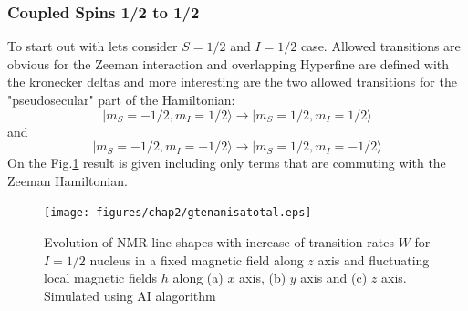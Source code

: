 \subsubsection{Coupled Spins 1/2 to 1/2}\label{coupledspinonehalfsection}
To start out with lets consider $S=1/2$ and $I=1/2$ case. Allowed transitions are obvious for the Zeeman interaction and overlapping Hyperfine are defined with the kronecker deltas and more interesting are the two allowed transitions for the "pseudosecular" part of the Hamiltonian:
$$|m_S=-1/2,m_I=1/2\rangle\rightarrow|m_S=1/2,m_I=1/2\rangle$$ 
and 
$$|m_S=-1/2,m_I=-1/2\rangle\rightarrow|m_S=1/2,m_I=-1/2\rangle$$ 
On the Fig.\ref{figure:spin05} result is given including only terms that are commuting with the Zeeman Hamiltonian. 
\begin{figure}[h!]
\centering
\texttt{[image: figures/chap2/gtenanisatotal.eps]}
\caption{Evolution of NMR line shapes with increase of transition rates $W$ for $I=1/2$ nucleus in a fixed magnetic field along $z$ axis and fluctuating local magnetic fields $h$ along (a) $x$ axis, (b) $y$ axis and (c) $z$ axis. Simulated using AI alagorithm}
\label{figure:spin05}
\end{figure}
